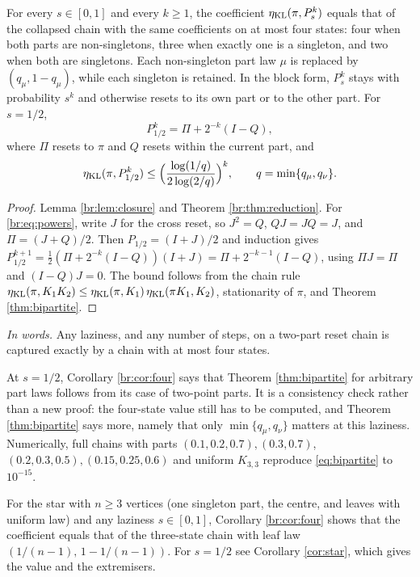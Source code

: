 \begin{corollary}\label{br:cor:four}
For every \(s\in[0,1]\) and every \(k\ge1\), the coefficient
\(\eta_{\mathrm{KL}}(\pi,P_s^k)\) equals that of the collapsed chain with the same
coefficients on at most four states: four when both parts are
non-singletons, three when exactly one is a singleton, and two when both
are singletons. Each non-singleton part law \(\mu\) is replaced by
\((q_\mu,1-q_\mu)\), while each singleton is retained. In the block form,
\(P_s^k\) stays with probability \(s^k\) and otherwise resets to its own part
or to the other part. For \(s=1/2\),
\begin{equation}\label{br:eq:powers}
P_{1/2}^k=\Pi+2^{-k}(I-Q),
\end{equation}
where \(\Pi\) resets to \(\pi\) and \(Q\) resets within the current part, and
\[
\eta_{\mathrm{KL}}(\pi,P_{1/2}^k)\le\Big(\frac{\log(1/q)}{2\log(2/q)}\Big)^{k},
\qquad q=\min\{q_\mu,q_\nu\}.
\]
\end{corollary}
\begin{proof}
Lemma \ref{br:lem:closure} and Theorem \ref{br:thm:reduction}. For
\eqref{br:eq:powers}, write \(J\) for the cross reset, so \(J^2=Q\),
\(QJ=JQ=J\), and \(\Pi=(J+Q)/2\). Then \(P_{1/2}=(I+J)/2\) and induction gives
\(P_{1/2}^{k+1}=\tfrac12(\Pi+2^{-k}(I-Q))(I+J)
=\Pi+2^{-k-1}(I-Q)\), using \(\Pi J=\Pi\) and \((I-Q)J=0\). The bound follows
from the chain rule \(\eta_{\mathrm{KL}}(\pi,K_1K_2)\le\eta_{\mathrm{KL}}(\pi,K_1)\,\eta_{\mathrm{KL}}(\pi K_1,K_2)\),
stationarity of \(\pi\), and Theorem \ref{thm:bipartite}.
\end{proof}

\noindent\textit{In words.} Any laziness, and any number of steps, on a
two-part reset chain is captured exactly by a chain with at most four states.

\begin{remark}\label{br:rem:thm61}
At \(s=1/2\), Corollary \ref{br:cor:four} says that Theorem
\ref{thm:bipartite} for arbitrary part laws follows from its case of
two-point parts. It is a consistency check rather than a new proof: the
four-state value still has to be computed, and Theorem \ref{thm:bipartite}
says more, namely that only \(\min\{q_\mu,q_\nu\}\) matters at this
laziness. Numerically, full chains with parts \((0.1,0.2,0.7),(0.3,0.7)\),
\((0.2,0.3,0.5),(0.15,0.25,0.6)\) and uniform \(K_{3,3}\) reproduce
\eqref{eq:bipartite} to \(10^{-15}\).
\end{remark}

\begin{remark}\label{br:cor:star}
For the star with \(n\ge3\) vertices (one singleton part, the centre, and
leaves with uniform law) and any laziness \(s\in[0,1]\), Corollary
\ref{br:cor:four} shows that the coefficient equals that of the three-state
chain with leaf law \((1/(n-1),\,1-1/(n-1))\). For \(s=1/2\) see
Corollary \ref{cor:star}, which gives the value and the extremisers.
\end{remark}

